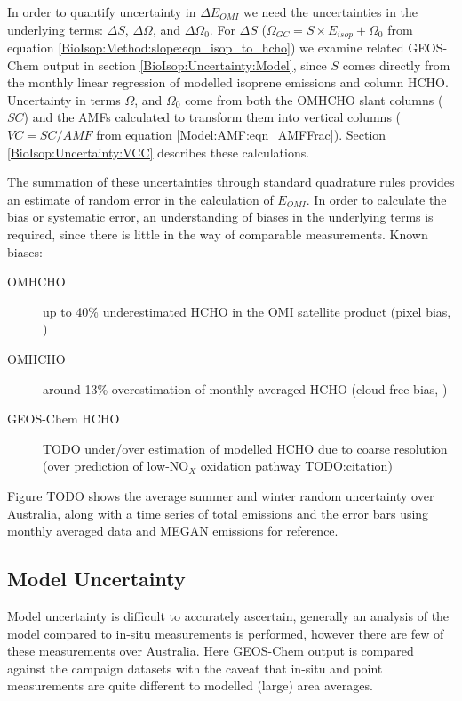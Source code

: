   In order to quantify uncertainty in $\Delta{E_{OMI}}$ we need the uncertainties in the underlying terms: $\Delta{S}$, $\Delta{\Omega}$, and $\Delta{\Omega_0}$. 
  For $\Delta{S}$ ($\Omega_{GC} = S \times E_{isop} + \Omega_0$ from equation \ref{BioIsop:Method:slope:eqn_isop_to_hcho}) we examine related GEOS-Chem output in section \ref{BioIsop:Uncertainty:Model}, since $S$ comes directly from the monthly linear regression of modelled isoprene emissions and column HCHO.
  Uncertainty in terms $\Omega$, and $\Omega_0$ come from both the OMHCHO slant columns ($SC$) and the AMFs calculated to transform them into vertical columns ($VC = SC/AMF$ from equation \ref{Model:AMF:eqn_AMFFrac}).
  Section \ref{BioIsop:Uncertainty:VCC} describes these calculations.
  
  The summation of these uncertainties through standard quadrature rules provides an estimate of random error in the calculation of $E_{OMI}$.
  In order to calculate the bias or systematic error, an understanding of biases in the underlying terms is required, since there is little in the way of comparable measurements.
  Known biases: 
  \begin{description}
    \item[OMHCHO] up to 40\% underestimated HCHO in the OMI satellite product (pixel bias, \parencite{Zhu2016,DeSmedt2015,Barkley2013})
    \item[OMHCHO] around 13\% overestimation of monthly averaged HCHO (cloud-free bias, \parencite{Surl2018})
    \item[GEOS-Chem HCHO] TODO under/over estimation of modelled HCHO due to coarse resolution (over prediction of low-NO$_X$ oxidation pathway TODO:citation)
  \end{description}
  
  Figure TODO shows the average summer and winter random uncertainty over Australia, along with a time series of total emissions and the error bars using monthly averaged data and MEGAN emissions for reference.
  
  \subsection{Model Uncertainty}
    \label{Bioisop:Uncertainty:Model}
    
    
    Model uncertainty is difficult to accurately ascertain, generally an analysis of the model compared to in-situ measurements is performed, however there are few of these measurements over Australia.
    Here GEOS-Chem output is compared against the campaign datasets with the caveat that in-situ and point measurements are quite different to modelled (large) area averages.
    

